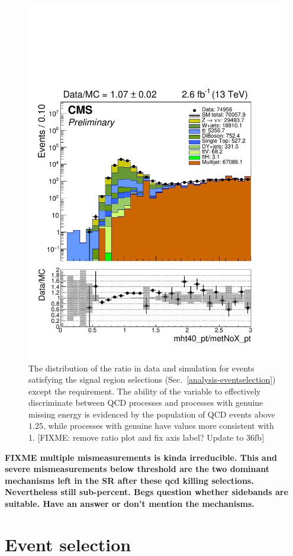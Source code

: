 \begin{figure}[t!]
\begin{center}
\includegraphics[width=0.7\linewidth]{figs/analysis/mhtmet}
\caption{The distribution of the \mhtmet ratio in data and simulation for 
events satisfying the signal region selections 
(Sec.~\ref{analysis-eventselection}) except the \mhtmet requirement. The 
ability of the variable to effectively discriminate between QCD processes and 
processes with genuine missing energy is evidenced by the population of QCD 
events above $1.25$, while processes with genuine \met have values more 
consistent with 1. [FIXME: remove ratio plot and fix axis label? Update to 
36fb]}
\label{fig:mhtmet}
\end{center}
\end{figure}




\textbf{FIXME
multiple mismeasurements is kinda irreducible.
This and severe mismeasurements below threshold are the two dominant mechanisms 
left in the SR after these qcd killing selections.
Nevertheless still sub-percent.
Begs question whether sidebands are suitable. Have an answer or don't mention 
the mechanisms.}




\section{Event selection}
\label{sec:analysis-eventselection}

